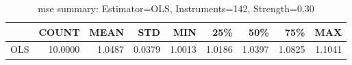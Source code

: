 \begin{table}[ht]
\centering
\caption{mse summary: Estimator=OLS, Instruments=142, Strength=0.30}
\begin{tabular}{lrrrrrrrr}
\toprule
 & COUNT & MEAN & STD & MIN & 25\% & 50\% & 75\% & MAX \\
\midrule
OLS & 10.0000 & 1.0487 & 0.0379 & 1.0013 & 1.0186 & 1.0397 & 1.0825 & 1.1041 \\
\bottomrule
\end{tabular}
\end{table}
